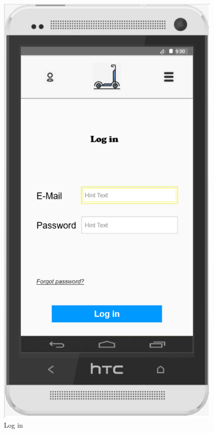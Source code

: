 \documentclass[a4paper, 12pt]{article}
\begin{document}
\begin{figure} [htbp]
  \begin{center}
    \includegraphics[scale=0.75]{images/prototypes/05-log-in.png}
  \end{center}
  \caption{Log in}
\end{figure}
\end{document}
